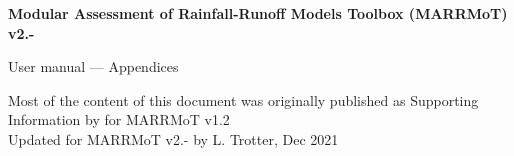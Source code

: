 \documentclass[oneside]{book}
\begin{document}
\thispagestyle{empty}
\begin{titlepage} %
\parbox[t]{\textwidth}{
		\centering
		\fontsize{20pt}{25pt}\sffamily\bfseries 
		{Modular Assessment of Rainfall-Runoff Models Toolbox (MARRMoT) v2.-}
}
\vfill
\parbox[t]{\textwidth}{
		\raggedright
		\fontsize{18pt}{20pt}\sffamily
		{User manual --- Appendices}
}
\vfill\vfill
\parbox[t]{\textwidth}{
		\raggedright
		\large
 		{Most of the content of this document was originally published as Supporting Information by \citet{Knoben2019} for MARRMoT v1.2\\[4pt]
               Updated for MARRMoT v2.- by L. Trotter, Dec 2021}
	}
	
\end{titlepage}
\tableofcontents

\pagestyle{fancy}
\newpage
{}





\newpage
{}


\end{document}
